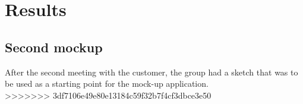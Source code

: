  

\section{Results}
\subsection*{Second mockup}
After the second meeting with the customer, the group had a sketch that was to be used as a starting point for the mock-up application. \\
\setlength\fboxsep{0pt}
\setlength\fboxrule{1pt}
>>>>>>> 3df7106e49e80e13184c59f32b7f4cf3dbce3e50



